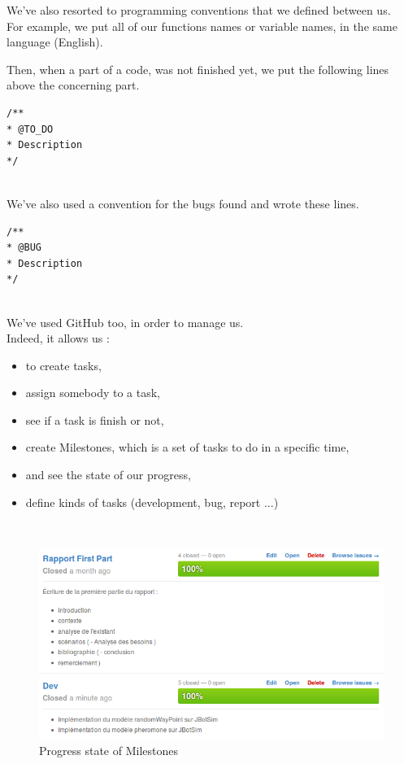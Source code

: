 We've also resorted to programming conventions that we defined between us.\\
For example, we put all of our functions names or variable names, in the same language (English).\\

\newpage

Then, when a part of a code, was not finished yet, we put the following lines above the concerning part.

\begin{lstlisting}[frame=trBL, title=Programming convention for unfinished code]
/**
* @TO_DO
* Description
*/
\end{lstlisting}
~\\

We've also used a convention for the bugs found and wrote these lines.\\

\begin{lstlisting}[frame=trBL, title=Programming convention for bugs]
/**
* @BUG
* Description
*/
\end{lstlisting}
~\\

We've used GitHub too, in order to manage us.\\
Indeed, it allows us :\\

\begin{itemize}
\item to create tasks, 
\item assign somebody to a task, 
\item see if a task is finish or not,
\item create Milestones, which is a set of tasks to do in a specific time, 
\item and see the state of our progress,
\item define kinds of tasks (development, bug, report ...)
\end{itemize}
~\\

\begin{figure}[!h]
   \includegraphics[scale=0.7]{../images/Milestones.png}
\caption{\label{Milestones}Progress state of Milestones}
\end{figure}

